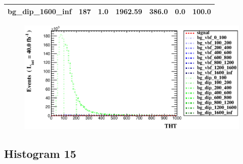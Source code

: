 \documentclass[a4paper, 10pt]{article}
\begin{document}
\begin{table}[H]
\begin{center}
\begin{tabular}{|m{23.0mm}|m{23.0mm}|m{18.0mm}|m{19.0mm}|m{19.0mm}|m{19.0mm}|m{19.0mm}|}
      \hline
      {\cellcolor{white}         bg\_dip\_1600\_inf}& {\cellcolor{white}         187}& {\cellcolor{white}         1.0}& {\cellcolor{white}         1962.59}& {\cellcolor{white}         386.0}& {\cellcolor{red}         0.0}& {\cellcolor{red}         100.0}\\
\hline
    \end{tabular}
  \end{center}
\end{table}

\begin{figure}[H]
  \begin{center}
    \includegraphics[scale=0.45]{selection_13.eps}\\
\caption{   }
  \end{center}
\end{figure}
      \newpage
\subsection{ Histogram 15}
\end{document}
